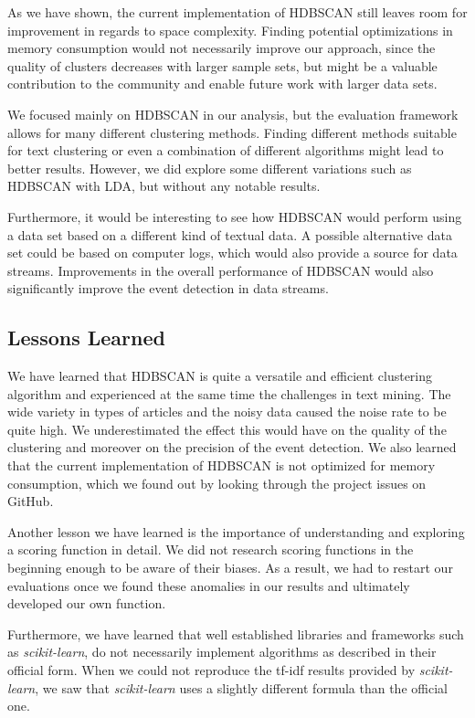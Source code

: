 As we have shown, the current implementation of HDBSCAN
still leaves room for improvement in regards to space complexity.
Finding potential optimizations in memory consumption would not necessarily improve our approach,
since the quality of clusters decreases with larger sample sets,
but might be a valuable contribution to the community and enable future work with larger data sets.

We focused mainly on HDBSCAN in our analysis, but the evaluation framework allows for many different clustering methods.
Finding different methods suitable for text clustering
or even a combination of different algorithms might lead to better results.
However, we did explore some different variations such as HDBSCAN with LDA, but without any notable results.

Furthermore, it would be interesting to see how HDBSCAN would perform
using a data set based on a different kind of textual data.
A possible alternative data set could be based on computer logs,
which would also provide a source for data streams.
Improvements in the overall performance of HDBSCAN would also significantly improve the event detection in data streams.

\subsection{Lessons Learned}
\label{subsec:6_lessons_learned}

We have learned that HDBSCAN is quite a versatile and efficient clustering algorithm
and experienced at the same time the challenges in text mining.
The wide variety in types of articles and the noisy data caused the noise rate to be quite high.
We underestimated the effect this would have on the quality of the clustering
and moreover on the precision of the event detection.
We also learned that the current implementation of HDBSCAN is not optimized for memory consumption,
which we found out by looking through the project issues on GitHub.

Another lesson we have learned is the importance of understanding and exploring a scoring function in detail.
We did not research scoring functions in the beginning enough to be aware of their biases.
As a result, we had to restart our evaluations once we found these anomalies in our results and
ultimately developed our own function.

Furthermore, we have learned that well established libraries and frameworks such as \textit{scikit-learn},
do not necessarily implement algorithms as described in their official form.
When we could not reproduce the tf-idf results provided by \textit{scikit-learn},
we saw that \textit{scikit-learn} uses a slightly different formula than the official one.
